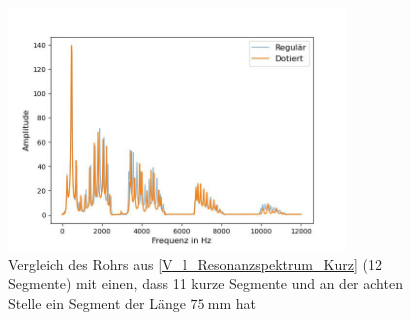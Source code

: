 \documentclass[../main.tex]{subfiles}
\begin{document}
        \begin{figure}[H]
            \centering
            \includegraphics[width=0.8\textwidth]{Bilddateien/Auswertung/V_o_Resonanzspektrum_Dotiert.jpg}
            \caption{Vergleich des Rohrs aus \ref{V_l_Resonanzspektrum_Kurz} (12 Segmente) mit einen, dass 11 kurze Segmente und an der achten Stelle ein Segment der Länge $\SI{75}{\milli\metre}$ hat}
            \label{fig:V_o_Resonanzspektrum_Dotiert}
        \end{figure}
\end{document}
